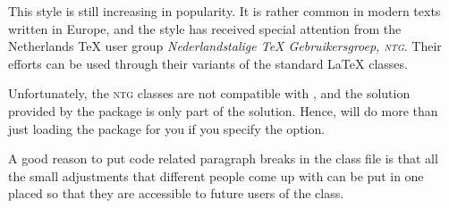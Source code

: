 \begin{example}\label{ex:paragraph-break-parskip}%
  \setlength{\parskip}{1ex}%
  \setlength{\parindent}{0pt}%
  This style is still increasing in popularity.  It is rather common in modern texts written in Europe, and the style has received special attention from the Netherlands \TeX{} user group \emph{Nederlandstalige \TeX{} Gebruikersgroep, \textsc{ntg}}.  Their efforts can be used through their variants of the standard \LaTeX{} classes.

  Unfortunately, the \textsc{ntg} classes are not compatible with \rtthesis, and the solution provided by the  package is only part of the solution.  Hence, \rtthesis will do more than just loading the  package for you if you specify the  option.

  A good reason to put code related paragraph breaks in the class file is that all the small adjustments that different people come up with can be put in one placed so that they are accessible to future users of the class.
\end{example}

